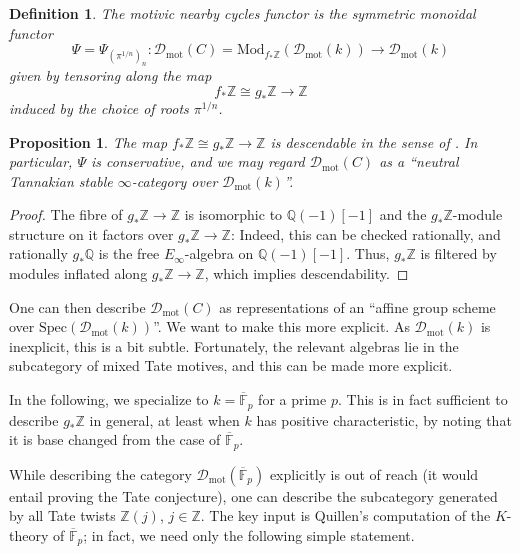 \documentclass[11pt]{amsart}
\numberwithin{equation}{section}
\numberwithin{theorem}{section}
\newtheorem{proposition}[theorem]{Proposition}
\newtheorem{definition}[theorem]{Definition}
\theoremstyle{definition}
\begin{document}
\begin{definition}\label{def:motivicnearby} The motivic nearby cycles functor is the symmetric monoidal functor
\[
\Psi = \Psi_{(\pi^{1/n})_n}: \mathcal D_{\mathrm{mot}}(C) = \mathrm{Mod}_{f_\ast \mathbb Z}(\mathcal D_{\mathrm{mot}}(k))\to \mathcal D_{\mathrm{mot}}(k)
\]
given by tensoring along the map
\[
f_\ast \mathbb Z\cong g_\ast \mathbb Z\to \mathbb Z
\]
induced by the choice of roots $\pi^{1/n}$.
\end{definition}

\begin{proposition} The map $f_\ast \mathbb Z\cong g_\ast \mathbb Z\to \mathbb Z$ is descendable in the sense of \cite[Definition 3.18]{MathewDescendable}. In particular, $\Psi$ is conservative, and we may regard $\mathcal D_{\mathrm{mot}}(C)$ as a ``neutral Tannakian stable $\infty$-category over $\mathcal D_{\mathrm{mot}}(k)$''.
\end{proposition}

\begin{proof} The fibre of $g_\ast \mathbb Z\to \mathbb Z$ is isomorphic to $\mathbb Q(-1)[-1]$ and the $g_\ast \mathbb Z$-module structure on it factors over $g_\ast \mathbb Z\to \mathbb Z$: Indeed, this can be checked rationally, and rationally $g_\ast \mathbb Q$ is the free $E_\infty$-algebra on $\mathbb Q(-1)[-1]$. Thus, $g_\ast \mathbb Z$ is filtered by modules inflated along $g_\ast \mathbb Z\to \mathbb Z$, which implies descendability.
\end{proof}

One can then describe $\mathcal D_{\mathrm{mot}}(C)$ as representations of an ``affine group scheme over $\mathrm{Spec}(\mathcal D_{\mathrm{mot}}(k))$''. We want to make this more explicit. As $\mathcal D_{\mathrm{mot}}(k)$ is inexplicit, this is a bit subtle. Fortunately, the relevant algebras lie in the subcategory of mixed Tate motives, and this can be made more explicit.

In the following, we specialize to $k=\overline{\mathbb F}_p$ for a prime $p$. This is in fact sufficient to describe $g_\ast \mathbb Z$ in general, at least when $k$ has positive characteristic, by noting that it is base changed from the case of $\overline{\mathbb F}_p$.

While describing the category $\mathcal D_{\mathrm{mot}}(\overline{\mathbb F}_p)$ explicitly is out of reach (it would entail proving the Tate conjecture), one can describe the subcategory generated by all Tate twists $\mathbb Z(j)$, $j\in \mathbb Z$. The key input is Quillen's computation of the $K$-theory of $\overline{\mathbb F}_p$; in fact, we need only the following simple statement.
\end{document}
